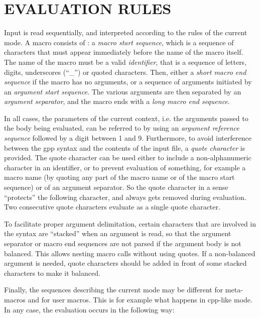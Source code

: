 \htmlHR

\section{EVALUATION RULES}

Input is read sequentially, and interpreted according to the rules of the
current mode. A macro consists of : a {\it macro start sequence}, which is a
sequence of characters that must appear immediately before the name of the
macro itself. The name of the macro must be a valid {\it identifier}, that is
a sequence of letters, digits, underscores (``\_'') or quoted characters.
Then, either a {\it short macro end sequence} if the macro has no arguments,
or a sequence of arguments initiated by an {\it argument start sequence}. The
various arguments are then separated by an {\it argument separator}, and the
macro ends with a {\it long macro end sequence}. 

In all cases, the parameters of the current context, i.e. the arguments passed
to the body being evaluated, can be referred to by using an {\it argument
reference sequence} followed by a digit between 1 and 9. Furthermore, to avoid
interference between the gpp syntax and the contents of the input file, a {\it
quote character} is provided. The quote character can be used either to
include a non-alphanumeric character in an identifier, or to prevent
evaluation of something, for example a macro name (by quoting any part of the
macro name or of the macro start sequence) or of an argument separator. So the
quote character in a sense ``protects'' the following character, and always
gets removed during evaluation. Two consecutive quote characters evaluate as a
single quote character. 

To facilitate proper argument delimitation, certain characters that are
involved in the syntax are ``stacked'' when an argument is read, so that the
argument separator or macro end sequences are not parsed if the argument body
is not balanced. This allows nesting macro calls without using quotes. If a
non-balanced argument is needed, quote characters should be added in front of
some stacked characters to make it balanced. 

Finally, the sequences describing the current mode may be different for
meta-macros and for user macros. This is for example what happens in cpp-like
mode. In any case, the evaluation occurs in the following way: 

